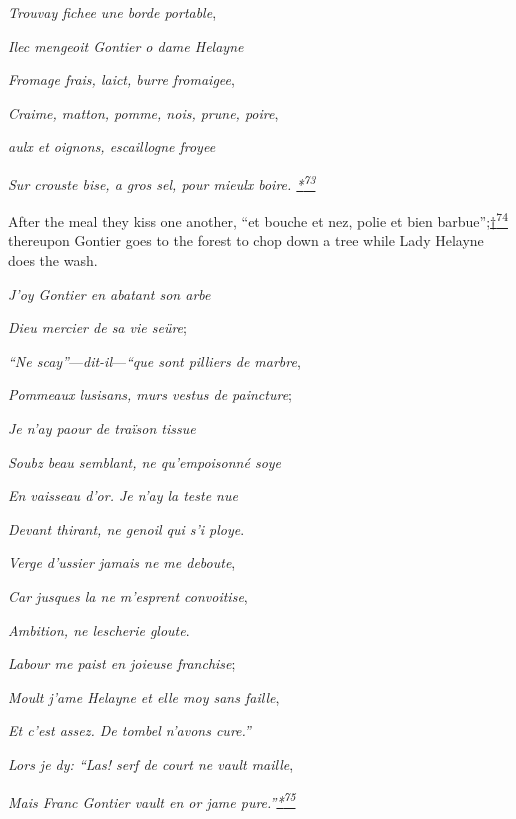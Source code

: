 \emph{Trouvay fichee une borde portable},

\emph{Ilec mengeoit Gontier o dame Helayne}

\emph{Fromage frais, laict, burre fromaigee},

\emph{Craime, matton, pomme, nois, prune, poire},

\emph{aulx et oignons, escaillogne froyee}

\emph{Sur crouste bise, a gros sel, pour mieulx boire.
\protect\hypertarget{10_Chapter_Three__THE_HEROIC_DREAM.xhtmlux5cux23id_3085}{\protect\hyperlink{23_NOTES.xhtmlux5cux23id_3086}{*\textsuperscript{73}}}}

After the meal they kiss one another, ``et bouche et nez, polie et bien
barbue'';\protect\hypertarget{10_Chapter_Three__THE_HEROIC_DREAM.xhtmlux5cux23id_3087}{\protect\hyperlink{23_NOTES.xhtmlux5cux23id_3088}{†\textsuperscript{74}}}
thereupon Gontier goes to the forest to chop down a tree while Lady
Helayne does the wash.

\emph{J'oy Gontier en abatant son arbe}

\emph{Dieu mercier de sa vie seüre};

\emph{``Ne scay''}---\emph{dit-il}---\emph{``que sont pilliers de
marbre},

\emph{Pommeaux lusisans, murs vestus de paincture};

\emph{Je n'ay paour de traïson tissue}

\emph{Soubz beau semblant, ne qu'empoisonné soye}

\emph{En vaisseau d'or. Je n'ay la teste nue}

\emph{Devant thirant, ne genoil qui s'i ploye}.

\emph{Verge d'ussier jamais ne me deboute},

\emph{\protect\hypertarget{10_Chapter_Three__THE_HEROIC_DREAM.xhtmlux5cux23page_122}{}{}Car
jusques la ne m'esprent convoitise},

\emph{Ambition, ne lescherie gloute}.

\emph{Labour me paist en joieuse franchise};

\emph{Moult j'ame Helayne et elle moy sans faille},

\emph{Et c'est assez. De tombel n'avons cure.''}

\emph{Lors je dy: ``Las! serf de court ne vault maille},

\emph{Mais Franc Gontier vault en or jame
pure.''\protect\hypertarget{10_Chapter_Three__THE_HEROIC_DREAM.xhtmlux5cux23id_3089}{\protect\hyperlink{23_NOTES.xhtmlux5cux23id_3090}{*\textsuperscript{75}}}}

